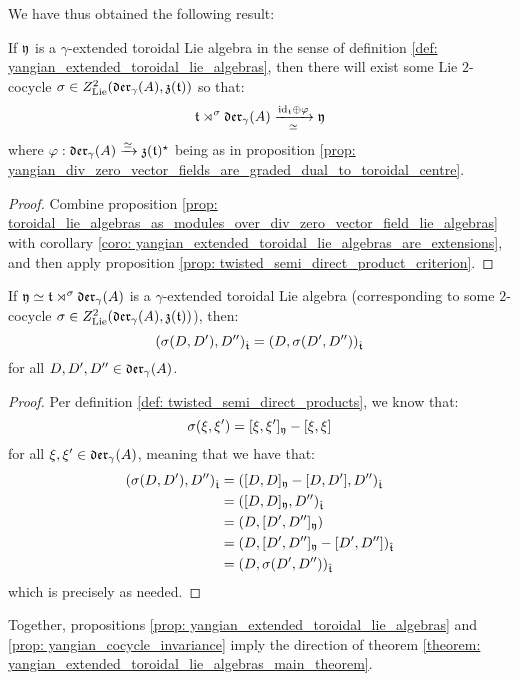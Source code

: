         We have thus obtained the following result:
        \begin{proposition} \label{prop: yangian_extended_toroidal_lie_algebras}
            If $\mathfrak{y}$ is a $\gamma$-extended toroidal Lie algebra in the sense of definition \ref{def: yangian_extended_toroidal_lie_algebras}, then there will exist some Lie $2$-cocycle $\sigma \in Z^2_{\mathrm{Lie}}(\mathfrak{der}_{\gamma}(A), \mathfrak{z}(\mathfrak{t}))$ so that:
                $$\mathfrak{t} \rtimes^{\sigma} \mathfrak{der}_{\gamma}(A) \xrightarrow[\simeq]{\mathrm{id}_{\mathfrak{t}} \oplus \varphi} \mathfrak{y}$$
            where $\varphi: \mathfrak{der}_{\gamma}(A) \xrightarrow[]{\simeq} \mathfrak{z}(\mathfrak{t})^{\star}$ being as in proposition \ref{prop: yangian_div_zero_vector_fields_are_graded_dual_to_toroidal_centre}.
        \end{proposition}
            \begin{proof}
                Combine proposition \ref{prop: toroidal_lie_algebras_as_modules_over_div_zero_vector_field_lie_algebras} with corollary \ref{coro: yangian_extended_toroidal_lie_algebras_are_extensions}, and then apply proposition \ref{prop: twisted_semi_direct_product_criterion}.
            \end{proof}
        \begin{corollary} \label{coro: yangian_cocycle_invariance}
            If $\mathfrak{y} \simeq \mathfrak{t} \rtimes^{\sigma} \mathfrak{der}_{\gamma}(A)$ is a $\gamma$-extended toroidal Lie algebra (corresponding to some $2$-cocycle $\sigma \in Z^2_{\mathrm{Lie}}(\mathfrak{der}_{\gamma}(A), \mathfrak{z}(\mathfrak{t}))$), then:
                $$(\sigma(D, D'), D'')_{\hat{\mathfrak{t}}} = (D, \sigma(D', D''))_{\hat{\mathfrak{t}}}$$
            for all $D, D', D'' \in \mathfrak{der}_{\gamma}(A)$.
        \end{corollary}
            \begin{proof}
                Per definition \ref{def: twisted_semi_direct_products}, we know that:
                    $$\sigma(\xi, \xi') = [\xi, \xi']_{\mathfrak{y}} - [\xi, \xi]$$
                for all $\xi, \xi' \in \mathfrak{der}_{\gamma}(A)$, meaning that we have that:
                    $$
                        \begin{aligned}
                            (\sigma(D, D'), D'')_{\hat{\mathfrak{t}}} & = ([D, D]_{\mathfrak{y}} - [D, D'], D'')_{\hat{\mathfrak{t}}}
                            \\
                            & = ([D, D]_{\mathfrak{y}}, D'')_{\hat{\mathfrak{t}}} 
                            \\
                            & = (D, [D', D'']_{\mathfrak{y}})
                            \\
                            & = (D, [D', D'']_{\mathfrak{y}} - [D', D''])_{\hat{\mathfrak{t}}}
                            \\
                            & = (D, \sigma(D', D''))_{\hat{\mathfrak{t}}}
                        \end{aligned}
                    $$
                which is precisely as needed.
            \end{proof}

        Together, propositions \ref{prop: yangian_extended_toroidal_lie_algebras} and \ref{prop: yangian_cocycle_invariance} imply the  direction of theorem \ref{theorem: yangian_extended_toroidal_lie_algebras_main_theorem}.